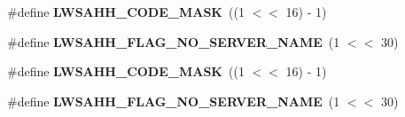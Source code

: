 \begin{DoxyCompactItemize}
\item 
\mbox{\label{group__HTTP-headers-create_ga6e47044becc8d711dc5e619e1e5a0058}} 
\#define {\bfseries L\+W\+S\+A\+H\+H\+\_\+\+C\+O\+D\+E\+\_\+\+M\+A\+SK}~((1 $<$$<$ 16) -\/ 1)
\item 
\mbox{\label{group__HTTP-headers-create_ga96942f8dbde926a4cf9f9e56a4e10ee3}} 
\#define {\bfseries L\+W\+S\+A\+H\+H\+\_\+\+F\+L\+A\+G\+\_\+\+N\+O\+\_\+\+S\+E\+R\+V\+E\+R\+\_\+\+N\+A\+ME}~(1 $<$$<$ 30)
\item 
\mbox{\label{group__HTTP-headers-create_ga6e47044becc8d711dc5e619e1e5a0058}} 
\#define {\bfseries L\+W\+S\+A\+H\+H\+\_\+\+C\+O\+D\+E\+\_\+\+M\+A\+SK}~((1 $<$$<$ 16) -\/ 1)
\item 
\mbox{\label{group__HTTP-headers-create_ga96942f8dbde926a4cf9f9e56a4e10ee3}} 
\#define {\bfseries L\+W\+S\+A\+H\+H\+\_\+\+F\+L\+A\+G\+\_\+\+N\+O\+\_\+\+S\+E\+R\+V\+E\+R\+\_\+\+N\+A\+ME}~(1 $<$$<$ 30)
\end{DoxyCompactItemize}
